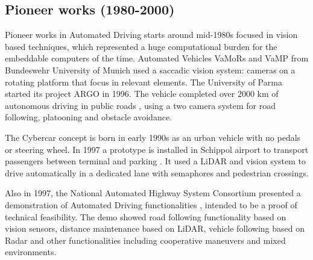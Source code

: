 \documentclass[journal]{IEEEtran}
\begin{document}
\subsection{Pioneer works (1980-2000)}

Pioneer works in Automated Driving starts around mid-1980s focused in vision 
based techniques, which represented a huge computational burden for the
embeddable computers of the time. Automated Vehicles VaMoRs 
\cite{Dickmanns1987} and VaMP \cite{Gregor2002} from Bundeswehr 
University of Munich used a saccadic vision system: cameras on a rotating 
platform that focus in relevant elements. 
The University of Parma started its project ARGO in 1996. %
The vehicle completed over 2000 km of autonomous driving in public roads 
\cite{Broggi1999}, using a two camera system for road following,
platooning and obstacle avoidance. 

The Cybercar concept is born in early 1990s \cite{Parent1993}
as an urban vehicle with no pedals or steering wheel. 
In 1997 a prototype is installed in Schippol airport to transport passengers 
between terminal and parking \cite{Ozguner2007}. It used a LiDAR and vision
system to drive automatically in a dedicated lane with semaphores and
pedestrian crossings.

Also in 1997, the National Automated Highway System Consortium presented a 
demonstration of Automated Driving functionalities \cite{Thorpe1997}, intended 
to be a proof of technical feasibility. 
The demo showed road following functionality based on vision sensors, distance 
maintenance based on LiDAR, vehicle following based on Radar and other 
functionalities including cooperative maneuvers and mixed environments.

\end{document}

